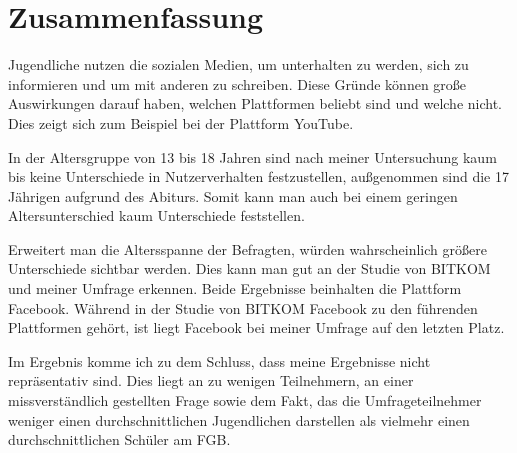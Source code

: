 \section{Zusammenfassung}

Jugendliche nutzen die sozialen Medien, um unterhalten zu werden, sich zu informieren und um mit anderen zu schreiben. Diese Gründe können große Auswirkungen darauf haben, welchen Plattformen beliebt sind und welche nicht. Dies zeigt sich zum Beispiel bei der Plattform YouTube.

In der Altersgruppe von 13 bis 18 Jahren sind nach meiner Untersuchung kaum bis keine Unterschiede in Nutzerverhalten festzustellen, außgenommen sind die 17 Jährigen aufgrund des Abiturs. Somit kann man auch bei einem geringen Altersunterschied kaum Unterschiede feststellen.

Erweitert man die Altersspanne der Befragten, würden wahrscheinlich größere Unterschiede sichtbar werden. Dies kann man gut an der Studie von BITKOM und meiner Umfrage erkennen. Beide Ergebnisse beinhalten die Plattform Facebook. Während in der Studie von BITKOM Facebook zu den führenden Plattformen gehört, ist liegt Facebook bei meiner Umfrage auf den letzten Platz.

Im Ergebnis komme ich zu dem Schluss, dass meine Ergebnisse nicht repräsentativ sind. Dies liegt an zu wenigen Teilnehmern, an einer missverständlich gestellten Frage sowie dem Fakt, das die Umfrageteilnehmer weniger einen durchschnittlichen Jugendlichen darstellen als vielmehr einen durchschnittlichen Schüler am FGB.